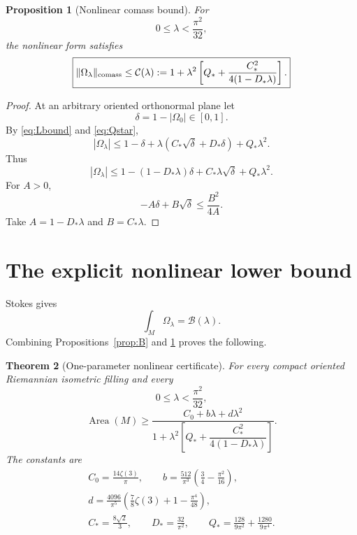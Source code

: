 \documentclass[11pt]{article}
\newtheorem{theorem}{Theorem}[section]
\newtheorem{proposition}[theorem]{Proposition}
\newcommand{\Area}{\operatorname{Area}}
\begin{document}
\begin{proposition}[Nonlinear comass bound]\label{prop:comass}
For
\[
        0\le\lambda<\frac{\pi^2}{32},
\]
the nonlinear form satisfies
\begin{equation}\label{eq:comass}
 \boxed{
 \|\Omega_\lambda\|_{\rm comass}
 \le
 \mathcal C(\lambda):=
 1+\lambda^2
 \left[
 Q_*+
 \frac{C_*^2}{4(1-D_*\lambda)}
 \right].}
\end{equation}
\end{proposition}

\begin{proof}
At an arbitrary oriented orthonormal plane let
\[
        \delta=1-|\Omega_0|\in[0,1].
\]
By \eqref{eq:Lbound} and \eqref{eq:Qstar},
\[
 |\Omega_\lambda|
 \le
 1-\delta
 +\lambda(C_*\sqrt\delta+D_*\delta)
 +Q_*\lambda^2.
\]
Thus
\[
 |\Omega_\lambda|
 \le
 1
 -(1-D_*\lambda)\delta
 +C_*\lambda\sqrt\delta
 +Q_*\lambda^2.
\]
For $A>0$,
\[
        -A\delta+B\sqrt\delta
        \le\frac{B^2}{4A}.
\]
Take
$A=1-D_*\lambda$ and $B=C_*\lambda$.
\end{proof}

\section{The explicit nonlinear lower bound}

Stokes gives
\[
        \int_M\Omega_\lambda=\mathcal B(\lambda).
\]
Combining Propositions~\ref{prop:B} and \ref{prop:comass} proves the
following.

\begin{theorem}[One-parameter nonlinear certificate]
\label{thm:nonlinear-formula}
For every compact oriented Riemannian isometric filling and every
\[
        0\le\lambda<\frac{\pi^2}{32},
\]
\begin{equation}\label{eq:nonlinear-master}
 \boxed{
 \Area(M)\ge
 \frac{
 C_0+b\lambda+d\lambda^2
 }{
 1+\lambda^2
 \left[
 Q_*+
 \dfrac{C_*^2}{4(1-D_*\lambda)}
 \right]
 }.}
\end{equation}
The constants are
\[
\begin{gathered}
 C_0=\frac{14\zeta(3)}{\pi},\qquad
 b=\frac{512}{\pi^3}
 \left(\frac34-\frac{\pi^2}{16}\right),\\
 d=\frac{4096}{\pi^5}
 \left(\frac78\zeta(3)+1-\frac{\pi^4}{48}\right),\\
 C_*=\frac{8\sqrt2}{3},\qquad
 D_*=\frac{32}{\pi^2},\qquad
 Q_*=\frac{128}{9\pi^2}+\frac{1280}{9\pi^4}.
\end{gathered}
\]
\end{theorem}
\end{document}
